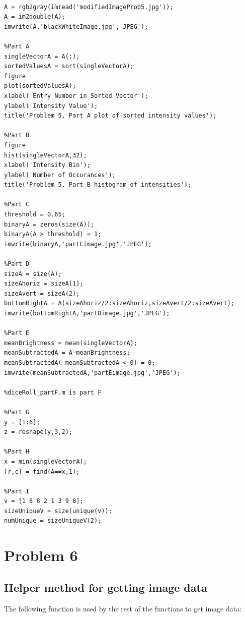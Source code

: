 \documentclass[11pt,psfig]{article}
\begin{document}
\begin{verbatim}

A = rgb2gray(imread('modifiedImageProb5.jpg'));
A = im2double(A);
imwrite(A,'blackWhiteImage.jpg','JPEG');

%Part A
singleVectorA = A(:);
sortedValuesA = sort(singleVectorA);
figure
plot(sortedValuesA);
xlabel('Entry Number in Sorted Vector');
ylabel('Intensity Value');
title('Problem 5, Part A plot of sorted intensity values');

%Part B
figure
hist(singleVectorA,32);
xlabel('Intensity Bin');
ylabel('Number of Occurances');
title('Problem 5, Part B histogram of intensities');

%Part C
threshold = 0.65;
binaryA = zeros(size(A));
binaryA(A > threshold) = 1;
imwrite(binaryA,'partCimage.jpg','JPEG');

%Part D
sizeA = size(A);
sizeAhoriz = sizeA(1);
sizeAvert = sizeA(2);
bottomRightA = A(sizeAhoriz/2:sizeAhoriz,sizeAvert/2:sizeAvert);
imwrite(bottomRightA,'partDimage.jpg','JPEG');

%Part E
meanBrightness = mean(singleVectorA);
meanSubtractedA = A-meanBrightness;
meanSubtractedA( meanSubtractedA < 0) = 0;
imwrite(meanSubtractedA,'partEimage.jpg','JPEG');

%diceRoll_partF.m is part F

%Part G
y = [1:6];
z = reshape(y,3,2);

%Part H
x = min(singleVectorA);
[r,c] = find(A==x,1);

%Part I
v = [1 8 8 2 1 3 9 8];
sizeUniqueV = size(unique(v));
numUnique = sizeUniqueV(2);

\end{verbatim}

\section*{Problem 6}

\subsection*{Helper method for getting image data}

The following function is used by the rest of the functions to get image data:
\end{document}
